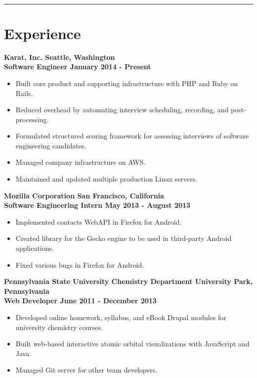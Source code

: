\documentclass[letterpaper]{article}
\newcommand{\setfontsize}{\fontsize{11.5}{16}\selectfont}
\newcommand{\sectionrule}[1] {
  \noindent\rule{\textwidth}{.1mm}
  \vspace{-11mm}
  \section{#1}
}
\newenvironment{indentsection}
  {\begin{adjustwidth}{10mm}{0pt}}
  {\end{adjustwidth}}
\newcommand{\job}[5] {
  \noindent\textbf{#1 \hfill #2}\\
  \textbf{#3 \hfill #4 - #5}

  \vspace{1mm}
}
\begin{document}
  \setfontsize

  \vspace{2mm}\\

  \sectionrule{Experience}

  \begin{indentsection}
    \job{Karat, Inc.}{Seattle, Washington}{Software Engineer}{January 2014}{Present}
    \begin{itemize}
      \item Built core product and supporting infrastructure with PHP and Ruby on Rails.
      \item Reduced overhead by automating interview scheduling, recording, and post-processing.
      \item Formulated structured scoring framework for assessing interviews of software engineering candidates.
      \item Managed company infrastructure on AWS.
      \item Maintained and updated multiple production Linux servers.
    \end{itemize}

    \vspace{5mm}

    \job{Mozilla Corporation}{San Francisco, California}{Software Engineering Intern}{May 2013}{August 2013}
    \begin{itemize}
      \item Implemented contacts WebAPI in Firefox for Android.
      \item Created library for the Gecko engine to be used in third-party Android applications.
      \item Fixed various bugs in Firefox for Android.
    \end{itemize}

    \vspace{5mm}

    \job{Pennsylvania State University Chemistry Department}{University Park, Pennsylvania}{Web Developer}{June 2011}{December 2013}
    \begin{itemize}
      \item Developed online homework, syllabus, and eBook Drupal modules for university chemistry courses.
      \item Built web-based interactive atomic orbital visualizations with JavaScript and Java.
      \item Managed Git server for other team developers.
    \end{itemize}
  \end{indentsection}
\end{document}
